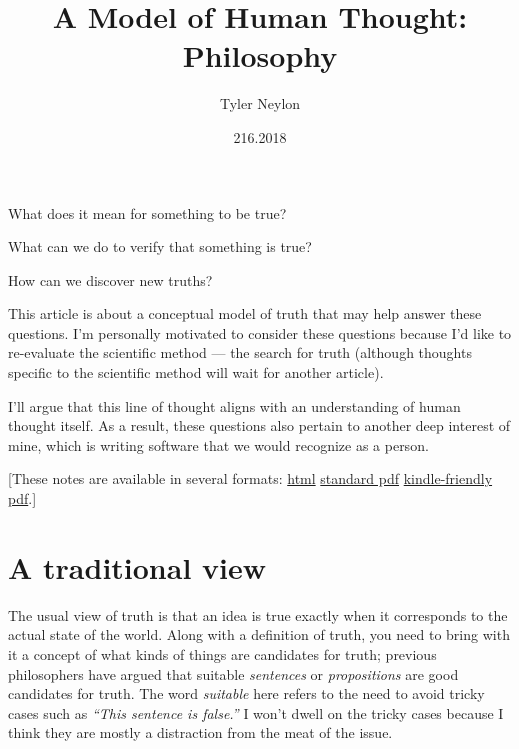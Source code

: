 \documentclass[20pt,]{extarticle}
\title{A Model of Human Thought: Philosophy}
\author{Tyler Neylon}
\date{216.2018}
\newcommand{\class}[1]{}
\newcommand{\optquad}{\quad}
\newcommand{\smallscrneg}{}
\newcommand{\smallscr}[1]{}
\newcommand{\bigscr}[1]{#1}
\newcommand{\smallscrskip}[1]{}
\begin{document}
\maketitle

\newcommand{\R}{\mathbb{R}}
\newcommand{\Z}{\mathbb{Z}}
\newcommand{\eqnset}[1]{\left.\mbox{$#1$}\;\;\right\rbrace\class{postbrace}{ }}
\providecommand{\optquad}{\class{optquad}{}}
\providecommand{\smallscrneg}{\class{smallscrneg}{ }}
\providecommand{\bigscr}[1]{\class{bigscr}{#1}}
\providecommand{\smallscr}[1]{\class{smallscr}{#1}}
\providecommand{\smallscrskip}[1]{\class{smallscrskip}{\hskip #1}}

What does it mean for something to be true?

What can we do to verify that something is true?

How can we discover new truths?

This article is about a conceptual model of truth that may help answer
these questions. I'm personally motivated to consider these questions
because I'd like to re-evaluate the scientific method --- the search for
truth (although thoughts specific to the scientific method will wait for
another article).

I'll argue that this line of thought aligns with an understanding of
human thought itself. As a result, these questions also pertain to
another deep interest of mine, which is writing software that we would
recognize as a person.

{[}These notes are available in several formats:
\href{http://tylerneylon.com/a/thought1/thought1.html}{html} \textbar{}
\href{http://tylerneylon.com/a/thought1/thought1.pdf}{standard pdf}
\textbar{}
\href{http://tylerneylon.com/a/thought1/thought1_for_kindle.pdf}{kindle-friendly
pdf}.{]}

\section{A traditional view}\label{a-traditional-view}

The usual view of truth is that an idea is true exactly when it
corresponds to the actual state of the world. Along with a definition of
truth, you need to bring with it a concept of what kinds of things are
candidates for truth; previous philosophers have argued that suitable
\emph{sentences} or \emph{propositions} are good candidates for truth.
The word \emph{suitable} here refers to the need to avoid tricky cases
such as \emph{``This sentence is false.''} I won't dwell on the tricky
cases because I think they are mostly a distraction from the meat of the
issue.
\end{document}
